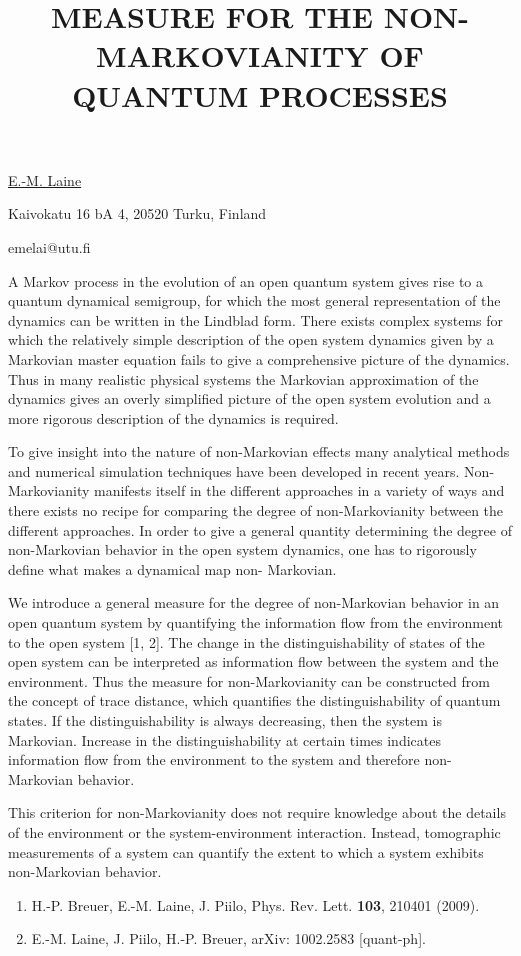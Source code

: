 \title{MEASURE FOR THE NON-MARKOVIANITY OF QUANTUM PROCESSES}

\underline{E.-M. Laine} 

{\normalsize{\vspace{-4mm}
Kaivokatu 16 bA 4, 20520 Turku, Finland

\email emelai@utu.fi}}

A Markov process in the evolution of an open quantum system gives rise to a quantum
dynamical semigroup, for which the most general representation of the dynamics can
be written in the Lindblad form. There exists complex systems for which the relatively
simple description of the open system dynamics given by a Markovian master equation
fails to give a comprehensive picture of the dynamics. Thus in many realistic physical
systems the Markovian approximation of the dynamics gives an overly simplified picture
of the open system evolution and a more rigorous description of the dynamics is required.

To give insight into the nature of non-Markovian effects many analytical methods and
numerical simulation techniques have been developed in recent years. Non-Markovianity
manifests itself in the different approaches in a variety of ways and there exists no recipe
for comparing the degree of non-Markovianity between the different approaches. In order
to give a general quantity determining the degree of non-Markovian behavior in the
open system dynamics, one has to rigorously define what makes a dynamical map non-
Markovian.

We introduce a general measure for the degree of non-Markovian behavior in an open
quantum system by quantifying the information flow from the environment to the open
system [1, 2]. The change in the distinguishability of states of the open system can be interpreted
as information flow between the system and the environment. Thus the measure
for non-Markovianity can be constructed from the concept of trace distance, which quantifies
the distinguishability of quantum states. If the distinguishability is always decreasing,
then the system is Markovian. Increase in the distinguishability at certain times indicates
information flow from the environment to the system and therefore non-Markovian behavior.

This criterion for non-Markovianity does not require knowledge about the details of the
environment or the system-environment interaction. Instead, tomographic measurements
of a system can quantify the extent to which a system exhibits non-Markovian behavior.

\begin{enumerate}
\item H.-P. Breuer, E.-M. Laine, J. Piilo, Phys. Rev. Lett. \textbf{103}, 210401 (2009).
\item E.-M. Laine, J. Piilo, H.-P. Breuer, arXiv: 1002.2583 [quant-ph].
\end{enumerate}

\vspace{\baselineskip} 